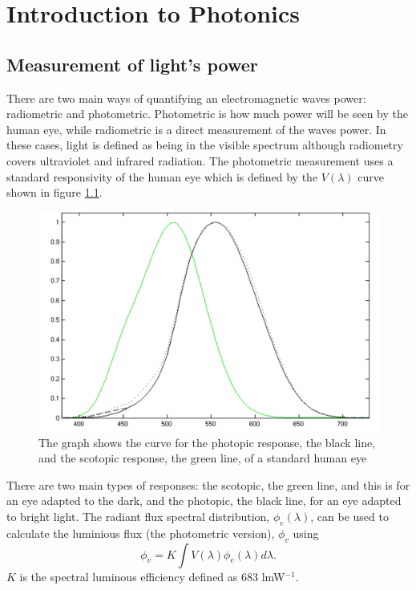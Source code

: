 \chapter{Introduction to Photonics}
\minitoc
\pagebreak
\section{Measurement of light's power}
There are two main ways of quantifying an electromagnetic waves power: radiometric and photometric.
Photometric is how much power will be seen by the human eye, while radiometric is a direct measurement of the waves power.
In these cases, light is defined as being in the visible spectrum although radiometry covers ultraviolet and infrared radiation.
The photometric measurement uses a standard responsivity of the human eye which is defined by the $V(\lambda)$ curve  shown in figure \ref{fig:ItP:eye}.
\begin{figure}[H]
	\includegraphics[width=\linewidth]{eye}
	\caption{The graph shows the curve for the photopic response, the black line, and the scotopic response, the green line, of a standard human eye}
	\label{fig:ItP:eye}
\end{figure}
There are two main types of responses: the scotopic, the green line, and this is for an eye adapted to the dark, and the photopic, the black line, for an eye adapted to bright light.
The radiant flux spectral distribution, $\phi_e(\lambda)$, can be used to calculate the luminious flux (the photometric version), $\phi_v$ using 
\begin{equation}
\phi_v = K\int{V(\lambda)\phi_e(\lambda)d\lambda}.
\label{eq:luminous}
\end{equation}
$K$ is the spectral luminous efficiency defined as 683 lmW$^{-1}$.
